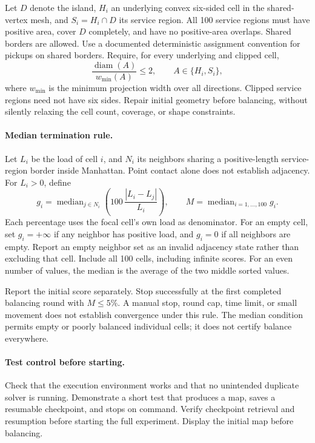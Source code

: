 \documentclass[11pt]{article}
\begin{document}
Let $D$ denote the island, $H_i$ an underlying convex six-sided cell
in the shared-vertex mesh, and $S_i=H_i\cap D$ its service region.
All 100 service regions must have positive area, cover $D$ completely,
and have no positive-area overlaps. Shared borders are allowed.
Use a documented deterministic assignment convention for pickups on
shared borders. Require, for every underlying and clipped cell,
\[
 \frac{\operatorname{diam}(A)}{w_{\min}(A)}\leq 2,
 \qquad A\in\{H_i,S_i\},
\]
where $w_{\min}$ is the minimum projection width over all directions.
Clipped service regions need not have six sides.
Repair initial geometry before balancing, without silently relaxing
the cell count, coverage, or shape constraints.

\paragraph{Median termination rule.}
Let $L_i$ be the load of cell $i$, and $N_i$ its neighbors sharing a
positive-length service-region border inside Manhattan. Point contact
alone does not establish adjacency. For $L_i>0$, define
\[
 g_i=\operatorname{median}_{j\in N_i}
       \left(100\,\frac{|L_i-L_j|}{L_i}\right),
 \qquad
 M=\operatorname{median}_{i=1,\ldots,100} g_i.
\]
Each percentage uses the focal cell's own load as denominator.
For an empty cell, set $g_i=+\infty$ if any neighbor has positive
load, and $g_i=0$ if all neighbors are empty. Report an empty neighbor
set as an invalid adjacency state rather than excluding that cell.
Include all 100 cells, including infinite scores. For an even number
of values, the median is the average of the two middle sorted values.

Report the initial score separately. Stop successfully at the first
completed balancing round with $M\leq5\%$. A manual stop, round cap,
time limit, or small movement does not establish convergence under
this rule. The median condition permits empty or poorly balanced
individual cells; it does not certify balance everywhere.

\paragraph{Test control before starting.}
Check that the execution environment works and that no unintended
duplicate solver is running. Demonstrate a short test that produces
a map, saves a resumable checkpoint, and stops on command.
Verify checkpoint retrieval and resumption before starting the full
experiment. Display the initial map before balancing.
\end{document}
